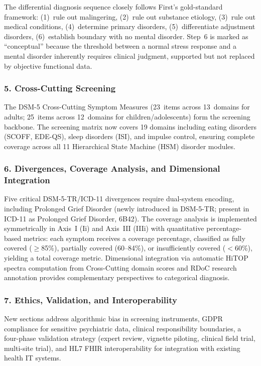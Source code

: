 \documentclass[11pt,a4paper]{article}
\begin{document}
The differential diagnosis sequence closely follows First's \citeyearpar{First2024} gold-standard framework: (1)~rule out malingering, (2)~rule out substance etiology, (3)~rule out medical conditions, (4)~determine primary disorders, (5)~differentiate adjustment disorders, (6)~establish boundary with no mental disorder. Step~6 is marked as ``conceptual'' because the threshold between a normal stress response and a mental disorder inherently requires clinical judgment, supported but not replaced by objective functional data.

\subsubsection*{5. Cross-Cutting Screening}

The DSM-5 Cross-Cutting Symptom Measures (23~items across 13~domains for adults; 25~items across 12~domains for children/adolescents) form the screening backbone. The screening matrix now covers 19 domains including eating disorders (SCOFF, EDE-QS), sleep disorders (ISI), and impulse control, ensuring complete coverage across all 11 Hierarchical State Machine (HSM) disorder modules.

\subsubsection*{6. Divergences, Coverage Analysis, and Dimensional Integration}

Five critical DSM-5-TR/ICD-11 divergences require dual-system encoding, including Prolonged Grief Disorder (newly introduced in DSM-5-TR; present in ICD-11 as Prolonged Grief Disorder, 6B42). The coverage analysis is implemented symmetrically in Axis~I (Ii) and Axis~III (IIIi) with quantitative percentage-based metrics: each symptom receives a coverage percentage, classified as fully covered ($\geq$85\%), partially covered (60--84\%), or insufficiently covered ($<$60\%), yielding a total coverage metric. Dimensional integration via automatic HiTOP spectra computation from Cross-Cutting domain scores and RDoC research annotation provides complementary perspectives to categorical diagnosis.

\subsubsection*{7. Ethics, Validation, and Interoperability}

New sections address algorithmic bias in screening instruments, GDPR compliance for sensitive psychiatric data, clinical responsibility boundaries, a four-phase validation strategy (expert review, vignette piloting, clinical field trial, multi-site trial), and HL7 FHIR interoperability for integration with existing health IT systems.
\end{document}
